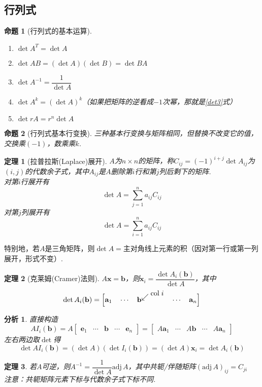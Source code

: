 \documentclass[11pt,UTF8]{ctexart}
\newtheorem{theorem}{定理}
\newtheorem{proposition}{命题}
\newtheorem*{analysis}{分析}
\def\vx{\mathbf{x}}
\def\dis{\displaystyle}
\newcommand{\vb}[1]{\mathbf{#1}}
\begin{document}
\subsection{行列式}
\begin{proposition}[行列式的基本运算]\mbox{}\par
\begin{enumerate}
	\itemsep -1pt
	\item $\det A^T=\det A$
	\item $\det AB=(\det A)(\det B)=\det BA$
	\item \label{det3}$\det A^{-1}=\dfrac{1}{\det A}$
	\item $\det A^k=(\det A)^k$（如果把矩阵的逆看成$-1$次幂，那就是\ref{det3}式）
	\item $\det rA=r^n\det A$
\end{enumerate}
\end{proposition}
\begin{proposition}[行列式基本行变换]
三种基本行变换与矩阵相同，但替换不改变它的值，交换乘$(-1)$，数乘乘$k$.
\end{proposition}
\begin{theorem}[拉普拉斯(Laplace)展开]
$A$为$n\times n$的矩阵，称$C_{ij}=(-1)^{i+j}\det A_{ij}$为$(i,j)$的代数余子式，其中$A_{ij}$是$A$删除第$i$行和第$j$列后剩下的矩阵.\\
对第$i$行展开有
\[\det A=\sum_{j=1}^{n}a_{ij}C_{ij}\]
对第$j$列展开有
\[\det A=\sum_{i=1}^{n}a_{ij}C_{ij}\]
\end{theorem}
特别地，若$A$是三角矩阵，则$\det A=$主对角线上元素的积（因对第一行或第一列展开，形式不变）.
\begin{theorem}[克莱姆(Cramer)法则]
$A\vx=\vb{b}$，则$\vx_i=\dfrac{\det A_i(\vb{b})}{\det A}$，其中\[\det A_i(\vb{b})=\Big[\vb{a}_1\quad\cdots\quad\vb{b}^{\dis\swarrow\raisebox{0.5em}{$\mathrm{col}\;i$}}\quad\cdots\quad\vb{a}_n\Big]\]
\end{theorem}
\begin{analysis}直接构造
\[AI_i(\vb{b})=A\begin{bmatrix}\vb{e}_1&\cdots&\vb{b}&\cdots&\vb{e}_n\end{bmatrix}=\begin{bmatrix}A\vb{a}_1&\cdots& A\vb{b}&\cdots& A\vb{a}_n\end{bmatrix}\]
左右两边取$\det$得
\[\det AI_i(\vb{b})=(\det A)(\det I_i(\vb{b}))=(\det A)\vx_i=\det A_i(\vb{b})\]
\end{analysis}
\begin{theorem}
若$A$可逆，则$A^{-1}=\dfrac{1}{\det A}\mathrm{adj}\,A$，其中共轭/伴随矩阵$(\mathrm{adj}\,A)_{ij}=C_{ji}$\\
注意：共轭矩阵元素下标与代数余子式下标不同.
\end{theorem}
\end{document}
